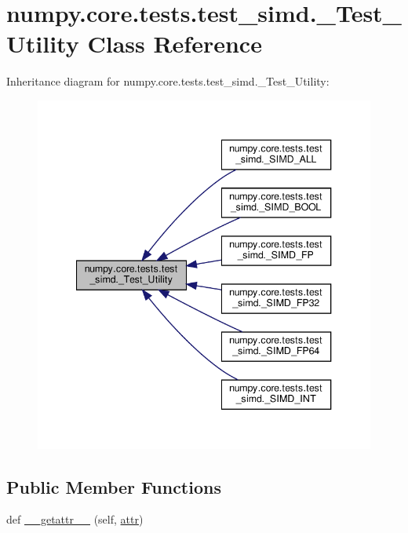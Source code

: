 \hypertarget{classnumpy_1_1core_1_1tests_1_1test__simd_1_1__Test__Utility}{}\section{numpy.\+core.\+tests.\+test\+\_\+simd.\+\_\+\+Test\+\_\+\+Utility Class Reference}
\label{classnumpy_1_1core_1_1tests_1_1test__simd_1_1__Test__Utility}


Inheritance diagram for numpy.\+core.\+tests.\+test\+\_\+simd.\+\_\+\+Test\+\_\+\+Utility\+:
\nopagebreak
\begin{figure}[H]
\begin{center}
\leavevmode
\includegraphics[width=340pt]{classnumpy_1_1core_1_1tests_1_1test__simd_1_1__Test__Utility__inherit__graph}
\end{center}
\end{figure}
\subsection*{Public Member Functions}
\begin{DoxyCompactItemize}
\item 
def \hyperlink{classnumpy_1_1core_1_1tests_1_1test__simd_1_1__Test__Utility_afc048dd55550c5cdd55129a98d117fb4}{\+\_\+\+\_\+getattr\+\_\+\+\_\+} (self, \hyperlink{namespacenumpy_1_1core_1_1tests_1_1test__simd_a718a5c65a2ee008987b40740a5b322f6}{attr})
\end{DoxyCompactItemize}
